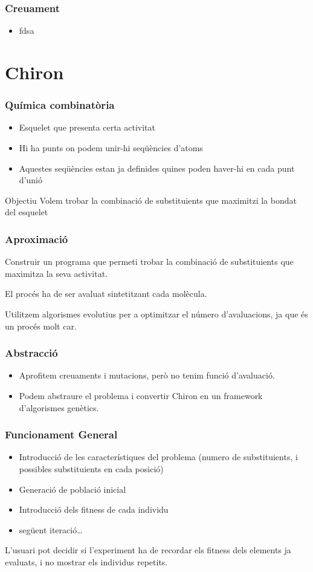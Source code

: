 \documentclass{beamer}
\begin{document}
\begin{frame}
	\frametitle{Creuament}
	\begin{itemize}
		\item fdsa
	\end{itemize}
\end{frame}

\section{Chiron} %
\label{sec:Chiron}
\begin{frame}
	\frametitle{Química combinatòria}
	\begin{itemize}
		\item Esquelet que presenta certa activitat
		\item Hi ha punts on podem unir-hi seqüències d'atoms
		\item Aquestes seqüències estan ja definides quines poden haver-hi en cada punt d'unió
	\end{itemize}
	\pause
	\begin{block}{Objectiu}
		Volem trobar la combinació de substituients que maximitzi la bondat del esquelet
	\end{block}
\end{frame}

\begin{frame}
	\frametitle{Aproximació}
	Construir un programa que permeti trobar la combinació de substituients que
	maximitza la seva activitat.

	El procés ha de ser avaluat sintetitzant cada molècula.

	Utilitzem algorismes evolutius per a optimitzar el número d'avaluacions, ja
	que és un procés molt car.
\end{frame}

\begin{frame}
	\frametitle{Abstracció}
	\begin{itemize}
	\item Aprofitem creuaments i mutacions, però no tenim funció d'avaluació.
	\pause
	\item Podem abstraure el problema i convertir Chiron en un framework
	d'algorismes genètics.
	\end{itemize}
\end{frame}

\begin{frame}
\frametitle{Funcionament General}
\begin{itemize}
\item Introducció de les característiques del problema (numero de substituients,
i possibles substituients en cada posició)
\item Generació de població inicial
\item Introducció dels fitness de cada individu
\item següent iteració\ldots
\end{itemize}
\pause
L'usuari pot decidir si l'experiment ha de recordar els fitness dels elements ja
evaluats, i no mostrar els individus repetits.
\end{frame}
\end{document}
